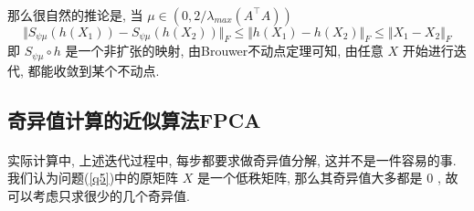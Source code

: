 \documentclass[a4paper, UTF8]{ctexart}				%
\numberwithin{equation}{section}				%
\begin{document}
			\paragraph{}
				\quad 那么很自然的推论是, 当 $\mu \in (0, 2/\lambda_{max}(A ^\top A))$
					\begin{equation}
						\Vert{S_{\psi \mu}(h(X_1)) - S_{\psi \mu}(h(X_2))}\Vert_F \le \Vert{h(X_1) - h(X_2)}\Vert_F \le \Vert{X_1 - X_2}\Vert_F
					\end{equation}
				即 $S_{\psi \mu} \circ h$ 是一个非扩张的映射, 由Brouwer不动点定理可知, 由任意 $X$ 开始进行迭代, 都能收敛到某个不动点.

		\subsection{奇异值计算的近似算法FPCA}
			\paragraph{}
				\quad 实际计算中, 上述迭代过程中, 每步都要求做奇异值分解, 这并不是一件容易的事. 我们认为问题(\ref{q5})中的原矩阵 $X$ 是一个低秩矩阵, 那么其奇异值大多都是 $0$ , 故可以考虑只求很少的几个奇异值.
\end{document}
